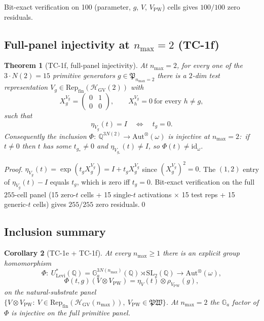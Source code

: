 \documentclass[11pt,a4paper]{article}
\theoremstyle{plain}
\newtheorem{theorem}{Theorem}[section]
\newtheorem{corollary}[theorem]{Corollary}
\theoremstyle{definition}
\newcommand{\nmax}{n_{\max}}
\newcommand{\HGV}{\mathcal{H}_{\mathrm{GV}}}
\newcommand{\Repcat}{\mathrm{Rep}_{\mathrm{fin}}}
\newcommand{\Aut}{\mathrm{Aut}}
\newcommand{\SL}{\mathrm{SL}}
\newcommand{\Ga}{\mathbb{G}_{a}}
\newcommand{\Q}{\mathbb{Q}}
\newcommand{\Ulev}{U^{*}_{\mathrm{Levi}}}
\newcommand{\Phimap}{\Phi}
\newcommand{\fibfun}{\omega}
\begin{document}
Bit-exact verification on 100 (parameter, $g$, $V$, $V_{\mathrm{PW}}$)
cells gives $100 / 100$ zero residuals.

\subsection{Full-panel injectivity at $\nmax = 2$ (TC-1f)}\label{sec:injectivity}

\begin{theorem}[TC-1f, full-panel injectivity]\label{thm:full_panel_injectivity}
At $\nmax = 2$, for every one of the $3 \cdot N(2) = 15$ primitive
generators $g \in \mathfrak{P}_{\nmax = 2}$ there is a $2$-dim test
representation $V_{g} \in \Repcat(\HGV(2))$ with
\[
   X_{g}^{V_{g}} = \begin{pmatrix} 0 & 1 \\ 0 & 0 \end{pmatrix},
   \qquad
   X_{h}^{V_{g}} = 0 \ \text{for every } h \ne g,
\]
such that
\[
   \eta_{V_{g}}(t) = I \quad\iff\quad t_{g} = 0.
\]
Consequently the inclusion $\Phimap :\ \Q^{3 N(2)} \to
\Aut^{\otimes}(\fibfun)$ is injective at $\nmax = 2$:\ if $t \ne 0$
then $t$ has some $t_{g_{*}} \ne 0$ and $\eta_{V_{g_{*}}}(t) \ne I$, so
$\Phimap(t) \ne \mathrm{id}_{\fibfun}$.
\end{theorem}

\begin{proof}
$\eta_{V_{g}}(t) = \exp(t_{g} X_{g}^{V_{g}}) = I + t_{g} X_{g}^{V_{g}}$
since $(X_{g}^{V_{g}})^{2} = 0$. The $(1, 2)$ entry of $\eta_{V_{g}}(t)
- I$ equals $t_{g}$, which is zero iff $t_{g} = 0$. Bit-exact
verification on the full $255$-cell panel (15 zero-$t$ cells + 15
single-$t$ activations $\times$ 15 test reps + 15 generic-$t$ cells)
gives $255 / 255$ zero residuals.\qed
\end{proof}

\subsection{Inclusion summary}\label{sec:inclusion_summary}

\begin{corollary}[TC-1e + TC-1f]\label{cor:inclusion}
At every $\nmax \ge 1$ there is an explicit group homomorphism
\[
   \Phimap :\ \Ulev(\Q) = \Ga^{3 N(\nmax)}(\Q) \rtimes \SL_{2}(\Q) \longrightarrow \Aut^{\otimes}(\fibfun),
\]
\[
   \Phimap(t, g)(V \otimes V_{\mathrm{PW}}) = \eta_{V}(t) \otimes \rho_{V_{\mathrm{PW}}}(g),
\]
on the natural-substrate panel $\{V \otimes V_{\mathrm{PW}} :\ V \in \Repcat(\HGV(\nmax)),\ V_{\mathrm{PW}} \in \mathfrak{PW}\}$. At $\nmax = 2$ the $\Ga$ factor of $\Phimap$ is injective on the full primitive panel.
\end{corollary}
\end{document}
